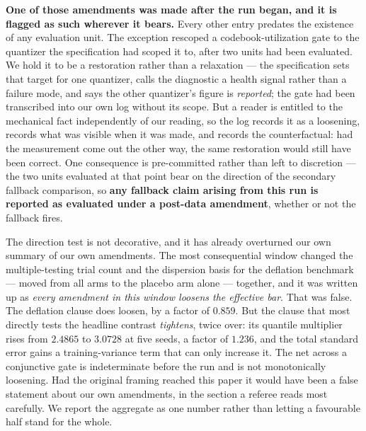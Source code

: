 \textbf{One of those amendments was made after the run began, and it is flagged as such wherever
it bears.} Every other entry predates the existence of any evaluation unit. The exception rescoped
a codebook-utilization gate to the quantizer the specification had scoped it to, after two units
had been evaluated. We hold it to be a restoration rather than a relaxation --- the specification
sets that target for one quantizer, calls the diagnostic a health signal rather than a failure
mode, and says the other quantizer's figure is \emph{reported}; the gate had been transcribed into
our own log without its scope. But a reader is entitled to the mechanical fact independently of our
reading, so the log records it as a loosening, records what was visible when it was made, and
records the counterfactual: had the measurement come out the other way, the same restoration would
still have been correct. One consequence is pre-committed rather than left to discretion --- the
two units evaluated at that point bear on the direction of the secondary fallback comparison, so
\textbf{any fallback claim arising from this run is reported as evaluated under a post-data
amendment}, whether or not the fallback fires.

The direction test is not decorative, and it has already overturned our own summary of our own
amendments. The most consequential window changed the multiple-testing trial count and the
dispersion basis for the deflation benchmark --- moved from all arms to the placebo arm alone
--- together, and it was written up as \emph{every
amendment in this window loosens the effective bar}. That was false. The deflation clause does
loosen, by a factor of $0.859$. But the clause that most directly tests the headline contrast
\emph{tightens}, twice over: its quantile multiplier rises from $2.4865$ to $3.0728$ at five seeds,
a factor of $1.236$, and the total standard error gains a training-variance term that can only
increase it. The net across a conjunctive gate is indeterminate before the run and is not
monotonically loosening. Had the original framing reached this paper it would have been a false
statement about our own amendments, in the section a referee reads most carefully. We report the
aggregate as one number rather than letting a favourable half stand for the whole.

